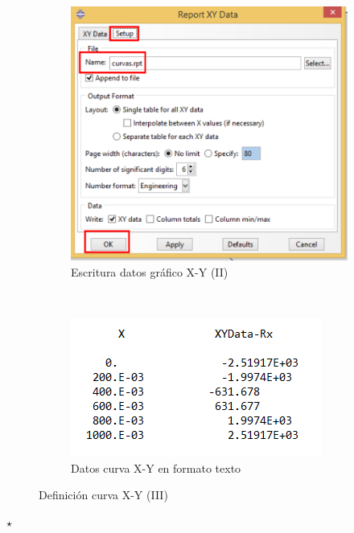 \begin{enumerate}
\begin{figure}[H]
  \begin{subfigure}{0.50\textwidth}
    \includegraphics[width=\textwidth]{./body/images/imagen112.pdf}
    \caption{Escritura datos gráfico X-Y (II)}
    \label{figu112}
  \end{subfigure}%
  ~ %
  \begin{subfigure}{0.50\textwidth}
    \includegraphics[width=\textwidth]{./body/images/imagen113}
    \caption{Datos curva X-Y en formato texto}
    \label{figu113}
  \end{subfigure}%
  \caption{Definición curva X-Y (III)}
\end{figure}

\end{enumerate}

\hspace{20mm}\hrulefill$\star$\hrulefill\hspace{20mm}
